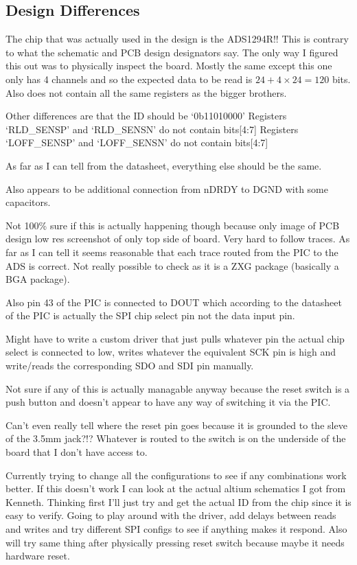 \subsection{Design Differences}
The chip that was actually used in the design is the ADS1294R!!
This is contrary to what the schematic and PCB design designators say.
The only way I figured this out was to physically inspect the board.
Mostly the same except this one only has 4 channels and so the expected data
to be read is \(24 + 4 \times 24 = 120\) bits.
Also does not contain all the same registers as the bigger brothers.

Other differences are that the ID should be `0b11010000'
Registers `RLD\_SENSP' and `RLD\_SENSN' do not contain bits[4:7]
Registers `LOFF\_SENSP' and `LOFF\_SENSN' do not contain bits[4:7]

As far as I can tell from the datasheet, everything else should be the same.

Also appears to be additional connection from nDRDY to DGND with some capacitors.

Not 100\% sure if this is actually happening though because only image of PCB design
low res screenshot of only top side of board. Very hard to follow traces.
As far as I can tell it seems reasonable that each trace routed from the PIC to the ADS
is correct. Not really possible to check as it is a ZXG package (basically a BGA package).

Also pin 43 of the PIC is connected to DOUT which according to the datasheet of the PIC
is actually the SPI chip select pin not the data input pin.

Might have to write a custom driver that just pulls whatever pin the actual chip select
is connected to low, writes whatever the equivalent SCK pin is high and write/reads
the corresponding SDO and SDI pin manually.

Not sure if any of this is actually managable anyway because the reset switch
is a push button and doesn't appear to have any way of switching it via the PIC.

Can't even really tell where the reset pin goes because it is grounded to the sleve of
the 3.5mm jack?!? Whatever is routed to the switch is on the underside of the board
that I don't have access to.

Currently trying to change all the configurations to see if any combinations work better.
If this doesn't work I can look at the actual altium schematics I got from Kenneth.
Thinking first I'll just try and get the actual ID from the chip
since it is easy to verify.
Going to play around with the driver, add delays between reads and writes and try different
SPI configs to see if anything makes it respond.
Also will try same thing after physically pressing reset switch because maybe it needs
hardware reset.

